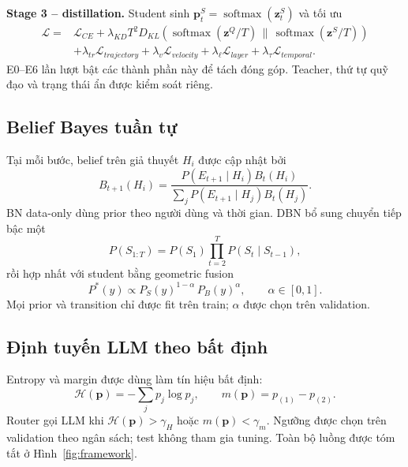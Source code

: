 \documentclass[runningheads]{llncs}
\newcommand{\vect}[1]{\boldsymbol{#1}}
\begin{document}
\textbf{Stage 3 -- distillation.} Student sinh $\vect{p}^{S}_t=\operatorname{softmax}(\vect{z}^{S}_t)$ và tối ưu
\begin{align}
 \mathcal{L}={}&\mathcal{L}_{CE}
 +\lambda_{KD}T^2D_{KL}\!\left(
 \operatorname{softmax}(\vect{z}^{Q}/T)\,\|\,
 \operatorname{softmax}(\vect{z}^{S}/T)\right) \nonumber\\
 &+\lambda_{tr}\mathcal{L}_{trajectory}
 +\lambda_{v}\mathcal{L}_{velocity}
 +\lambda_{\ell}\mathcal{L}_{layer}
 +\lambda_{\tau}\mathcal{L}_{temporal}.
\end{align}
E0--E6 lần lượt bật các thành phần này để tách đóng góp. Teacher, thứ tự quỹ đạo và trạng thái ẩn được kiểm soát riêng.

\subsection{Belief Bayes tuần tự}

Tại mỗi bước, belief trên giả thuyết $H_i$ được cập nhật bởi
\begin{equation}
 B_{t+1}(H_i)=
 \frac{P(E_{t+1}\mid H_i)B_t(H_i)}
 {\sum_jP(E_{t+1}\mid H_j)B_t(H_j)}.
\end{equation}
BN data-only dùng prior theo người dùng và thời gian. DBN bổ sung chuyển tiếp bậc một \cite{murphy2002dbn}
\begin{equation}
 P(S_{1:T})=P(S_1)\prod_{t=2}^{T}P(S_t\mid S_{t-1}),
\end{equation}
rồi hợp nhất với student bằng geometric fusion
\begin{equation}
 P^*(y)\propto
 P_S(y)^{1-\alpha}\,P_B(y)^{\alpha},\qquad \alpha\in[0,1].
\end{equation}
Mọi prior và transition chỉ được fit trên train; $\alpha$ được chọn trên validation.

\subsection{Định tuyến LLM theo bất định}

Entropy và margin được dùng làm tín hiệu bất định:
\begin{equation}
 \mathcal{H}(\vect{p})=-\sum_jp_j\log p_j,\qquad
 m(\vect{p})=p_{(1)}-p_{(2)}.
\end{equation}
Router gọi LLM khi $\mathcal{H}(\vect{p})>\gamma_H$ hoặc $m(\vect{p})<\gamma_m$. Ngưỡng được chọn trên validation theo ngân sách; test không tham gia tuning. Toàn bộ luồng được tóm tắt ở Hình~\ref{fig:framework}.
\end{document}
